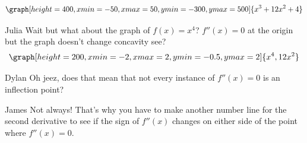 \documentclass{ximera}
\begin{document}
\begin{question}
\begin{multipleChoice}
\end{multipleChoice}
\begin{feedback}
\[
\graph[height=400,xmin=-50,xmax=50,ymin=-300,ymax=500]{x^3+12x^2+4}
\]
\end{feedback}
\end{question}
\begin{dialogue}
\item[Julia] Wait but what about the graph of $f(x)=x^4$? $f''(x)=0$ at the origin but the graph doesn't change concavity see?
\[
\graph[height=200,xmin=-2,xmax=2,ymin=-0.5,ymax=2]{x^4,12x^2}
\]
\item[Dylan] Oh jeez, does that mean that not every instance of $f''(x)=0$ is an inflection point?
\item[James] Not always! That's why you have to make another number line for the second derivative to see if the sign of $f''(x)$ changes on either side of the point where $f''(x)=0$.
\end{dialogue}
\end{document}
